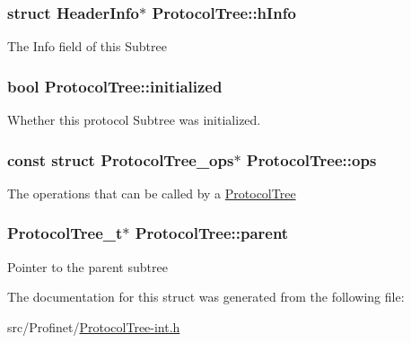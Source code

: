 \subsubsection[{h\+Info}]{\setlength{\rightskip}{0pt plus 5cm}struct {\bf Header\+Info}$\ast$ Protocol\+Tree\+::h\+Info}\label{struct_protocol_tree_a8fce6fc18afa7ddd1fa4f8895064d1ba}
The Info field of this Subtree \hypertarget{struct_protocol_tree_a6d4f209acc4331cbb440df967d7a4054}{}
\subsubsection[{initialized}]{\setlength{\rightskip}{0pt plus 5cm}bool Protocol\+Tree\+::initialized}\label{struct_protocol_tree_a6d4f209acc4331cbb440df967d7a4054}
Whether this protocol Subtree was initialized. \hypertarget{struct_protocol_tree_aad4c24f365eae4e59887dc5753a0d891}{}
\subsubsection[{ops}]{\setlength{\rightskip}{0pt plus 5cm}const struct {\bf Protocol\+Tree\+\_\+ops}$\ast$ Protocol\+Tree\+::ops}\label{struct_protocol_tree_aad4c24f365eae4e59887dc5753a0d891}
The operations that can be called by a \hyperlink{struct_protocol_tree}{Protocol\+Tree} \hypertarget{struct_protocol_tree_a4d7aa1ac9fb932c4a4a7ebc140066ab1}{}
\subsubsection[{parent}]{\setlength{\rightskip}{0pt plus 5cm}Protocol\+Tree\+\_\+t$\ast$ Protocol\+Tree\+::parent}\label{struct_protocol_tree_a4d7aa1ac9fb932c4a4a7ebc140066ab1}
Pointer to the parent subtree 

The documentation for this struct was generated from the following file\+:\begin{DoxyCompactItemize}
\item 
src/\+Profinet/\hyperlink{_protocol_tree-int_8h}{Protocol\+Tree-\/int.\+h}\end{DoxyCompactItemize}
